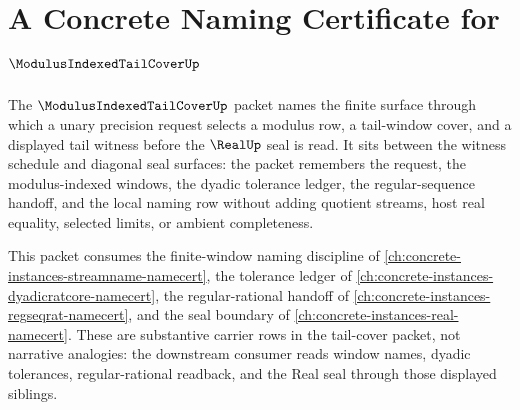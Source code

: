 \chapter{A Concrete Naming Certificate for $\ModulusIndexedTailCoverUp$}
\label{ch:concrete-instances-modulus-indexed-tail-cover-namecert}

The $\ModulusIndexedTailCoverUp$ packet names the finite surface through which a unary precision request selects a modulus row, a tail-window cover, and a displayed tail witness before the $\RealUp$ seal is read. It sits between the witness schedule and diagonal seal surfaces: the packet remembers the request, the modulus-indexed windows, the dyadic tolerance ledger, the regular-sequence handoff, and the local naming row without adding quotient streams, host real equality, selected limits, or ambient completeness.

This packet consumes the finite-window naming discipline of \autoref{ch:concrete-instances-streamname-namecert}, the tolerance ledger of \autoref{ch:concrete-instances-dyadicratcore-namecert}, the regular-rational handoff of \autoref{ch:concrete-instances-regseqrat-namecert}, and the seal boundary of \autoref{ch:concrete-instances-real-namecert}. These are substantive carrier rows in the tail-cover packet, not narrative analogies: the downstream consumer reads window names, dyadic tolerances, regular-rational readback, and the Real seal through those displayed siblings.

